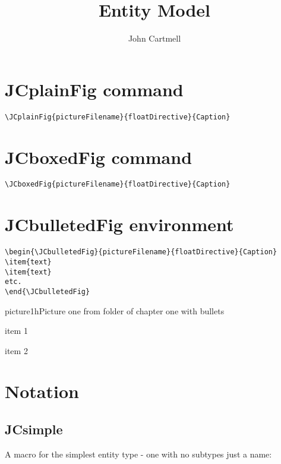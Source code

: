\documentclass[10pt,a4paper]{article}
\author{ John Cartmell}
\title{Entity Model}
\begin{document}
\maketitle
\section {JCplainFig command}

\begin{verbatim}
\JCplainFig{pictureFilename}{floatDirective}{Caption}
\end{verbatim}


\section {JCboxedFig command}

\begin{verbatim}
\JCboxedFig{pictureFilename}{floatDirective}{Caption}
\end{verbatim}


\section {JCbulletedFig environment}

\begin{verbatim}
\begin{\JCbulletedFig}{pictureFilename}{floatDirective}{Caption}
\item{text}
\item{text}
etc.
\end{\JCbulletedFig}
\end{verbatim}


\begin{JCbulletedFig}{picture1}{h}{Picture one from folder of chapter one with bullets}
\item{item 1}
\item{item 2}
\end{JCbulletedFig}

\section{Notation}

\subsection {JCsimple}
A macro for the simplest entity type - one with no subtypes just a name:
\end{document}
